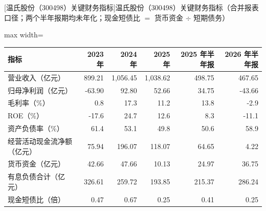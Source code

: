 \begin{center}\small\setlength{\tabcolsep}{3.4pt}
[温氏股份（300498）关键财务指标]{温氏股份（300498）关键财务指标（合并报表口径；两个半年报期均未年化；现金短债比 $=$ 货币资金 $\div$ 短期债务）}
\begin{adjustbox}{max width=\textwidth}
\begin{tabular}{@{}lrrrrr@{}}
\toprule
指标 & 2023 年 & 2024 年 & 2025 年 & 2025 年半年报 & 2026 年半年报 \\
\midrule
营业收入（亿元） & 899.21 & 1,056.45 & 1,038.62 & 498.75 & 467.65 \\
归母净利润（亿元） & -63.90 & 92.80 & 52.66 & 34.75 & -43.66 \\
毛利率（\%） & 0.8 & 17.3 & 11.2 & 13.8 & -2.9 \\
ROE（\%） & -17.6 & 24.7 & 12.6 & 8.3 & -11.1 \\
资产负债率（\%） & 61.4 & 53.1 & 49.8 & 50.6 & 58.9 \\
经营活动现金流净额（亿元） & 75.94 & 196.07 & 118.07 & 64.65 & 4.22 \\
货币资金（亿元） & 42.66 & 47.66 & 10.13 & 24.97 & 36.75 \\
有息负债合计（亿元） & 326.61 & 259.72 & 193.85 & 215.37 & 286.24 \\
现金短债比（倍） & 0.47 & 0.67 & 0.25 & 0.41 & 0.25 \\
\bottomrule
\end{tabular}
\end{adjustbox}
\end{center}

